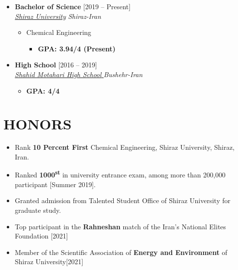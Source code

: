 \documentclass[10pt,a4paper,sans]{moderncv} %
\begin{document}
	\begin{itemize}

		\item \textbf{Bachelor of Science} \hfill [2019 -- Present] \\
		\href{https://cpe.shirazu.ac.ir/}{ \emph{Shiraz University}} \hfill \emph{Shiraz-Iran}
		
		\begin{itemize}
			\item Chemical Engineering
			\begin{itemize}		
				 
				   
				\item\textbf{GPA: 3.94/4 (Present)}
			\end{itemize}
		\end{itemize}
		
		
		\vspace{0.71 em}
		
		\item \textbf{High School} \hfill [2016 -- 2019] \\
		\href{}{ \emph{Shahid Motahari High School }} \hfill \emph{Bushehr-Iran}
		
		\begin{itemize}
			\begin{itemize}		
				
				\item\textbf{GPA: 4/4}
			\end{itemize}
		\end{itemize}
		
		
		
		
	\end{itemize}
	
	\vspace{-0.9em}
	\section{HONORS}
	
	\begin{itemize}
		\item  Rank \textbf{10 Percent First} Chemical Engineering,
		Shiraz University, Shiraz, Iran.
		\item Ranked \textbf {1000\textsuperscript{st} } in university entrance exam, among more than 200,000
		participant [Summer 2019].
		
		\item Granted admission from Talented Student Office of Shiraz University for graduate study. 
		
		\item Top participant in the \textbf{Rahneshan} match of the Iran's National Elites Foundation [2021] 
		
		\item Member of the Scientific Association of \textbf {Energy and Environment} of Shiraz University[2021] 
		
		
	\end{itemize}
	
\end{document}
